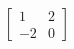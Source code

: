 \documentclass[preview]{standalone}
\begin{document}
\begin{center}
$\begin{bmatrix} 1 & 2 \\ -2 & 0 \end{bmatrix}$
\end{center}
\end{document}
